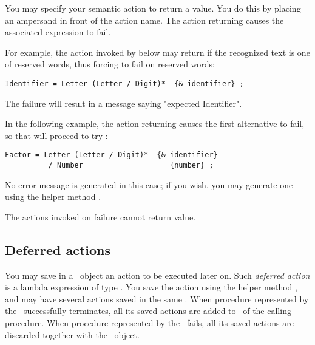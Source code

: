 You may specify your semantic action to return a  value.
You do this by placing an ampersand in front of the action name.
The action returning  causes the associated expression to fail.

For example, the action  invoked by  below
may return  if the recognized text is one of reserved words,
thus forcing  to fail on reserved words:

\small
\begin{Verbatim}[frame=single,framesep=2mm,samepage=true,xleftmargin=15mm,xrightmargin=15mm,baselinestretch=0.8]
   Identifier = Letter (Letter / Digit)*  {& identifier} ;
\end{Verbatim}
\normalsize

The failure will result in a message saying "expected Identifier".

In the following example, 
the action  returning  causes the first alternative to fail,
so that  will proceed to try :

\small
\begin{Verbatim}[frame=single,framesep=2mm,samepage=true,xleftmargin=15mm,xrightmargin=15mm,baselinestretch=0.8]
   Factor = Letter (Letter / Digit)*  {& identifier} 
          / Number                    {number} ;
\end{Verbatim}
\normalsize

No error message is generated in this case; if you wish, you may generate one
using the helper method .

The actions invoked on failure cannot return  value.

\subsection{Deferred actions\label{DefAct}}

You may save in a \Phrase\ object an action to be executed later on.
Such \textit{deferred action} is a lambda expression of type .  
You save the action using the helper method ,
and may have several actions saved in the same \Phrase.
When procedure represented by the \Phrase\ successfully terminates,
all its saved actions are added to \Phrase\ of the calling procedure. 
When procedure represented by the \Phrase\ fails, all its saved actions
are discarded together with the \Phrase\ object.

